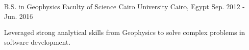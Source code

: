 

\begin{cventries}

  \cventry
    {B.S. in Geophysics} %
    {Faculty of Science Cairo University} %
    {Cairo, Egypt} %
    {Sep. 2012 - Jun. 2016} %
    {
      \begin{cvitems} %
            \item {Leveraged strong analytical skills from Geophysics to solve complex problems in software development.}
      \end{cvitems}
    }

\end{cventries}
